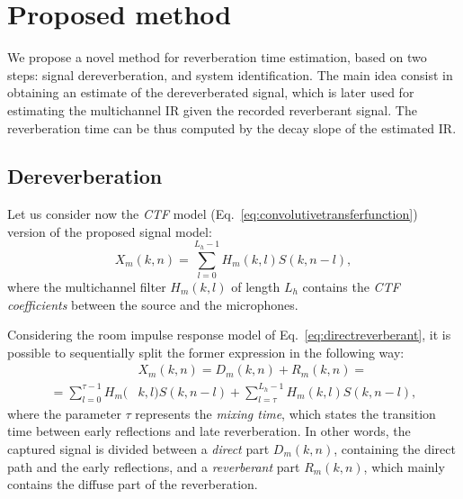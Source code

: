 \section{Proposed method}
\label{sec:proposed}

We propose a novel method for reverberation time estimation, based on two steps: signal dereverberation, and system identification. The main idea consist in obtaining an estimate of the dereverberated signal, which is later used for estimating the multichannel IR given the recorded reverberant signal. The reverberation time can be thus computed by the decay slope of the estimated IR. 

\subsection{Dereverberation}

Let us consider now the \textit{CTF} model (Eq.~\ref{eq:convolutivetransferfunction}) version of the proposed signal model:
\begin{equation}
\label{eq:ctf}
	X_m(k, n) = \sum_{l=0}^{L_h-1} H_m(k, l) S(k, n-l), 
\end{equation} 
where the multichannel filter $H_m(k, l)$ of length $L_h$ contains the \textit{CTF coefficients} between the source and the microphones.

Considering the room impulse response model of Eq.~\ref{eq:directreverberant}, 
it is possible to sequentially split the former expression in the following way:
\begin{equation}
\label{eq:model}
\begin{aligned}
	&X_m(k, n) = D_m(k, n) + R_m(k,n) = \\
	=\sum_{l=0}^{\tau-1} H_m(&k, l) S(k, n-l) + \sum_{l=\tau}^{L_h-1} H_m(k, l) S(k, n-l),
\end{aligned}
\end{equation} 
where the parameter $\tau$ represents the \textit{mixing time}, which states the transition time between early reflections and late reverberation. 
In other words, the captured signal is divided between a \textit{direct} part $D_m(k, n)$, containing the direct path and the early reflections, and a \textit{reverberant} part $R_m(k, n)$, which mainly contains the diffuse part of the reverberation.

